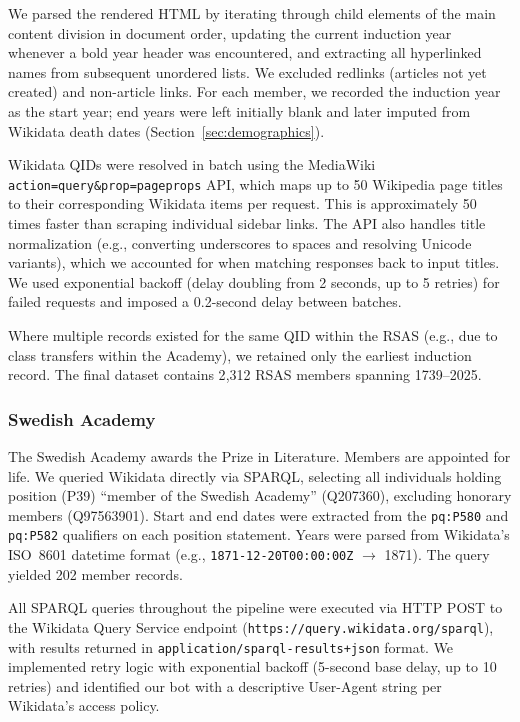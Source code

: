 We parsed the rendered HTML by iterating through child elements of the
main content division in document order, updating the current induction year
whenever a bold year header was encountered, and extracting all hyperlinked
names from subsequent unordered lists. We excluded redlinks (articles not
yet created) and non-article links. For each member, we recorded the
induction year as the start year; end years were left initially blank and
later imputed from Wikidata death dates (Section~\ref{sec:demographics}).

Wikidata QIDs were resolved in batch using the MediaWiki
\texttt{action=query\&prop=pageprops} API, which maps up to 50 Wikipedia
page titles to their corresponding Wikidata items per request. This is
approximately 50 times faster than scraping individual sidebar links. The
API also handles title normalization (e.g., converting underscores to spaces
and resolving Unicode variants), which we accounted for when matching
responses back to input titles. We used exponential backoff (delay doubling
from 2 seconds, up to 5 retries) for failed requests and imposed a
0.2-second delay between batches.

Where multiple records existed for the same QID within the RSAS (e.g., due
to class transfers within the Academy), we retained only the earliest
induction record. The final dataset contains 2{,}312 RSAS members spanning
1739--2025.

\subsubsection{Swedish Academy}

The Swedish Academy awards the Prize in Literature. Members are appointed for
life. We queried Wikidata directly via SPARQL, selecting all individuals
holding position (P39) ``member of the Swedish Academy'' (Q207360), excluding
honorary members (Q97563901). Start and end dates were extracted from the
\texttt{pq:P580} and \texttt{pq:P582} qualifiers on each position statement.
Years were parsed from Wikidata's ISO~8601 datetime format
(e.g., \texttt{1871-12-20T00:00:00Z} $\to$ 1871). The query yielded 202
member records.

All SPARQL queries throughout the pipeline were executed via HTTP POST to the
Wikidata Query Service endpoint (\texttt{https://query.wikidata.org/sparql}),
with results returned in \texttt{application/sparql-results+json} format. We
implemented retry logic with exponential backoff (5-second base delay, up to
10 retries) and identified our bot with a descriptive User-Agent string per
Wikidata's access policy.

